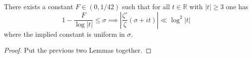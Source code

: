 \begin{theorem}[LogDerivZetaUniformLogSquaredBound]
\label{LogDerivZetaUniformLogSquaredBound}
\leanok
There exists a constant $F\in(0,1/42)$ such that for all $t\in\mathbb{R}$ with $|t|\geq 3$ one has
    $$1-\frac{F}{\log|t|}\leq\sigma\implies\left|\frac{\zeta'}{\zeta}(\sigma+it)\right|\ll\log^2|t|$$
    where the implied constant is uniform in $\sigma$.
\end{theorem}
\begin{proof}
\leanok
Put the previous two Lemmas together.
\end{proof}
